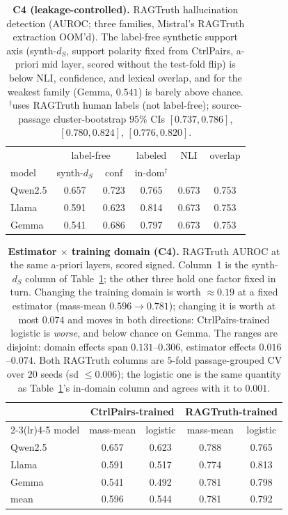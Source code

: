 \begin{table}[t]\centering\small
\setlength{\tabcolsep}{3.5pt}
\begin{tabular}{@{}lccc|cc@{}}
\toprule
 & \multicolumn{2}{c}{label-free} & labeled & NLI & overlap \\
model & synth-$d_S$ & conf & in-dom$^{\dagger}$ & & \\
\midrule
Qwen2.5 & 0.657 & 0.723 & 0.765 & 0.673 & 0.753 \\
Llama   & 0.591 & 0.623 & 0.814 & 0.673 & 0.753 \\
Gemma   & 0.541 & 0.686 & 0.797 & 0.673 & 0.753 \\
\bottomrule
\end{tabular}
\caption{\textbf{C4 (leakage-controlled).} RAGTruth hallucination detection
(AUROC; three families, Mistral's RAGTruth extraction OOM'd). The label-free
synthetic support axis (synth-$d_S$, support polarity
fixed from CtrlPairs, a-priori mid layer, scored without the test-fold flip) is
below NLI, confidence, and lexical overlap, and for the weakest family
(Gemma, $0.541$) is barely above chance. $^{\dagger}$uses RAGTruth human labels (not
label-free); source-passage cluster-bootstrap $95\%$ CIs $[0.737,0.786]$, $[0.780,0.824]$,
$[0.776,0.820]$.}
\label{tab:c4}
\end{table}

\begin{table}[t]\centering\small
\setlength{\tabcolsep}{3pt}
\begin{tabular}{@{}lcccc@{}}
\toprule
 & \multicolumn{2}{c}{CtrlPairs-trained} & \multicolumn{2}{c}{RAGTruth-trained} \\
\cmidrule(lr){2-3}\cmidrule(lr){4-5}
model & mass-mean & logistic & mass-mean & logistic \\
\midrule
Qwen2.5 & 0.657 & 0.623 & 0.788 & 0.765 \\
Llama   & 0.591 & 0.517 & 0.774 & 0.813 \\
Gemma   & 0.541 & 0.492 & 0.781 & 0.798 \\
\midrule
mean    & 0.596 & 0.544 & 0.781 & 0.792 \\
\bottomrule
\end{tabular}
\caption{\textbf{Estimator $\times$ training domain (C4).} RAGTruth AUROC at the same
a-priori layers, scored signed. Column~1 is the synth-$d_S$ column of
Table~\ref{tab:c4}; the other three hold one factor fixed in turn. Changing the
training domain is worth ${\approx}0.19$ at a fixed estimator (mass-mean
$0.596{\to}0.781$); changing it is worth at most $0.074$ and moves in both
directions: CtrlPairs-trained logistic is \emph{worse}, and below chance on Gemma.
The ranges are disjoint: domain effects span $0.131$--$0.306$, estimator effects
$0.016$--$0.074$.
Both RAGTruth columns are $5$-fold passage-grouped CV over $20$ seeds (sd $\le0.006$);
the logistic one is the same quantity as Table~\ref{tab:c4}'s in-domain column and
agrees with it to $0.001$.}
\label{tab:estdom}
\end{table}

